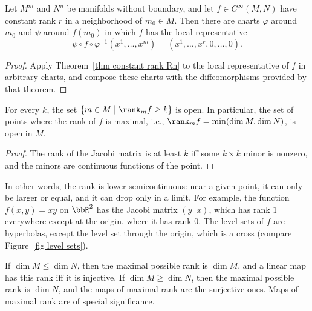 \begin{thm}\label{Rank thm}
    Let $M^m$ and $N^n$ be manifolds without boundary, and let $f\in C^\infty(M,N)$ have constant rank $r$ in a neighborhood of $m_0\in M$. Then there are charts $\varphi$ around $m_0$ and $\psi$ around $f(m_0)$ in which $f$ has the local representative
    \[\psi\circ f\circ\varphi^{-1}(x^1,\ldots,x^m)=(x^1,\ldots,x^r,0,\ldots,0).\]
\end{thm}
\begin{proof}
    Apply Theorem~\ref{thm constant rank Rn} to the local representative of $f$ in arbitrary charts, and compose these charts with the diffeomorphisms provided by that theorem.
\end{proof}

\begin{prop}\label{domain of maximal rank}
    For every $k$, the set $\{m\in M\mid\rank_mf\geq k\}$ is open. In particular, the set of points where the rank of $f$ is maximal, i.e., $\rank_mf=\min(\dim M,\dim N)$, is open in $M$.
\end{prop}
\begin{proof}
    The rank of the Jacobi matrix is at least $k$ iff some $k\times k$ minor is nonzero, and the minors are continuous functions of the point.
\end{proof}
In other words, the rank is lower semicontinuous: near a given point, it can only be larger or equal, and it can drop only in a limit. For example, the function $f(x,y)=xy$ on $\bbR^2$ has the Jacobi matrix $(y\;\;x)$, which has rank $1$ everywhere except at the origin, where it has rank $0$. The level sets of $f$ are hyperbolas, except the level set through the origin, which is a cross (compare Figure~\ref{fig level sets}).

If $\dim M\leq\dim N$, then the maximal possible rank is $\dim M$, and a linear map has this rank iff it is injective. If $\dim M\geq\dim N$, then the maximal possible rank is $\dim N$, and the maps of maximal rank are the surjective ones. Maps of maximal rank are of special significance.

